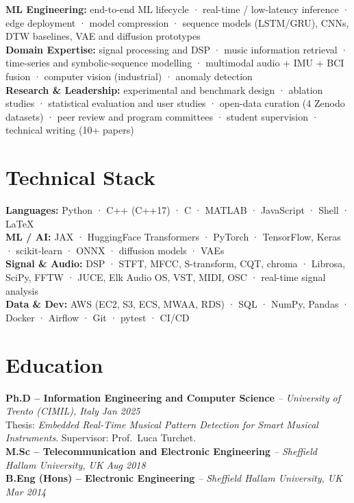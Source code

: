 \documentclass[11pt]{article}
\begin{document}
\textbf{ML Engineering:} end-to-end ML lifecycle · real-time / low-latency inference · edge deployment · model compression · sequence models (LSTM/GRU), CNNs, DTW baselines, VAE and diffusion prototypes\\
\textbf{Domain Expertise:} signal processing and DSP · music information retrieval · time-series and symbolic-sequence modelling · multimodal audio + IMU + BCI fusion · computer vision (industrial) · anomaly detection\\
\textbf{Research \& Leadership:} experimental and benchmark design · ablation studies · statistical evaluation and user studies · open-data curation (4 Zenodo datasets) · peer review and program committees · student supervision · technical writing (10+ papers)

\section*{Technical Stack}

\textbf{Languages:} Python · C++ (C++17) · C · MATLAB · JavaScript · Shell · LaTeX\\
\textbf{ML / AI:} JAX · HuggingFace Transformers · PyTorch · TensorFlow, Keras · scikit-learn · ONNX · diffusion models · VAEs\\
\textbf{Signal \& Audio:} DSP · STFT, MFCC, S-transform, CQT, chroma · Librosa, SciPy, FFTW · JUCE, Elk Audio OS, VST, MIDI, OSC · real-time signal analysis\\
\textbf{Data \& Dev:} AWS (EC2, S3, ECS, MWAA, RDS) · SQL · NumPy, Pandas · Docker · Airflow · Git · pytest · CI/CD

\section*{Education}
\textbf{Ph.D -- Information Engineering and Computer Science} \textit{\small{ -- University of Trento (CIMIL), Italy}} \hfill \textit{Jan 2025}\\
{\footnotesize Thesis: \textit{Embedded Real-Time Musical Pattern Detection for Smart Musical Instruments}. Supervisor: Prof.~Luca Turchet.}\\[3pt]
\noindent\textbf{M.Sc -- Telecommunication and Electronic Engineering} \textit{\small{ -- Sheffield Hallam University, UK}} \hfill \textit{Aug 2018}\\[2pt]
\noindent\textbf{B.Eng (Hons) -- Electronic Engineering} \textit{\small{ -- Sheffield Hallam University, UK}} \hfill \textit{Mar 2014}
\end{document}
